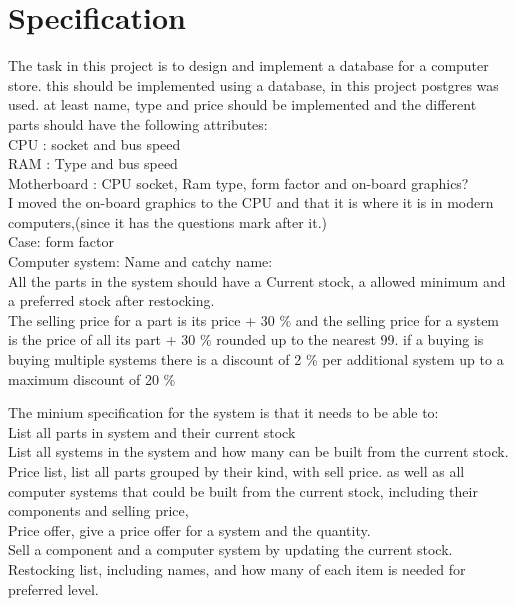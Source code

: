 \documentclass[a4paper,10pt,titlepage]{report}
\begin{document}
\section{Specification}
The task in this project is to design and implement a database for a computer store. this should be implemented using a database, in this project postgres was used. at least name, type and price should be implemented and the different parts should have the following attributes:
\\ \vspace{2 mm}
CPU : socket and bus speed
\\ \vspace{2 mm}
RAM : Type and bus speed
\\ \vspace{2 mm}
Motherboard : CPU socket, Ram type, form factor and on-board graphics?
\\ \vspace{2 mm}
I moved the on-board graphics to the CPU and that it is where it is in modern computers,(since it has the questions mark after it.)
\\ \vspace{2 mm} 
Case: form factor
\\ \vspace{2 mm}
Computer system: Name and catchy name:
\\ \vspace{2 mm}
All the parts in the system should have a Current stock, a allowed minimum and a preferred stock after restocking.
\\ \vspace{2 mm}
The selling price for a part is its price + 30 \%
and the selling price for a system is the price of all its part + 30 \% rounded up to the nearest 99. if a buying is buying multiple systems there is a discount of 2 \% per additional system up to a maximum discount of 20 \%

The minium specification for the system is that it needs to be able to:
\\ \vspace{2 mm}
List all parts in system and their current stock
\\ \vspace{2 mm}
List all systems in the system and how many can be built from the current stock.
\\ \vspace{2 mm}
Price list, list all parts grouped by their kind, with sell price. as well as all computer systems that could be built from the current stock, including their components and selling price,
\\ \vspace{2 mm}
Price offer, give a price offer for a system and the quantity.
\\ \vspace{2 mm}
Sell a component and a computer system by updating the current stock.
\\ \vspace{2 mm}
Restocking list, including names, and how many of each item is needed for preferred level. 
\\ \vspace{5 mm}
\end{document}

